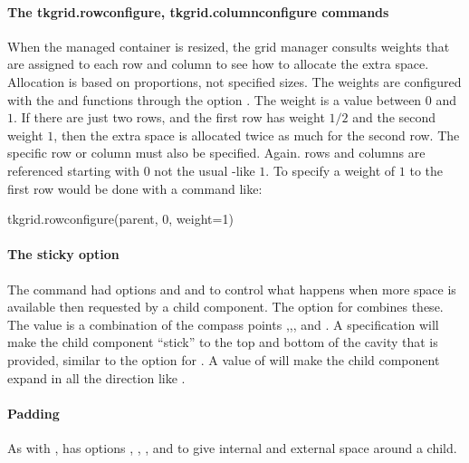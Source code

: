 \paragraph{The tkgrid.rowconfigure, tkgrid.columnconfigure commands}
When the managed container is resized, the grid manager consults
weights that are assigned to each row and column to see how to
allocate the extra space. Allocation is based on proportions, not
specified sizes. The weights are configured with the
 and 
functions through the option .
The weight is a value between $0$ and $1$. If there are just two rows, and
the first row has weight $1/2$ and the second weight $1$, then the extra
space is allocated twice as much for the second row. The specific row
or column must also be specified. Again. rows and columns are referenced
starting with $0$ not the usual \R-like $1$. To specify a weight of $1$
to the first row would be done with a command like:

%
\begin{Schunk}
\begin{Sinput}
 tkgrid.rowconfigure(parent, 0, weight=1)
\end{Sinput}
\end{Schunk}
%
\paragraph{The sticky option}
The  command had options  and
 and  to control what happens when more space
is available then requested by a child component. The
 option for  combines
these. The value is a combination of the compass points
,,, and . A specification
 will make the child component ``stick'' to the top and
bottom of the cavity that is provided, similar to the 
option for . A value of  will make the
child component expand in all the direction like .

\paragraph{Padding}
As with ,  has options
, , ,
and  to give internal and external space around a
child.

